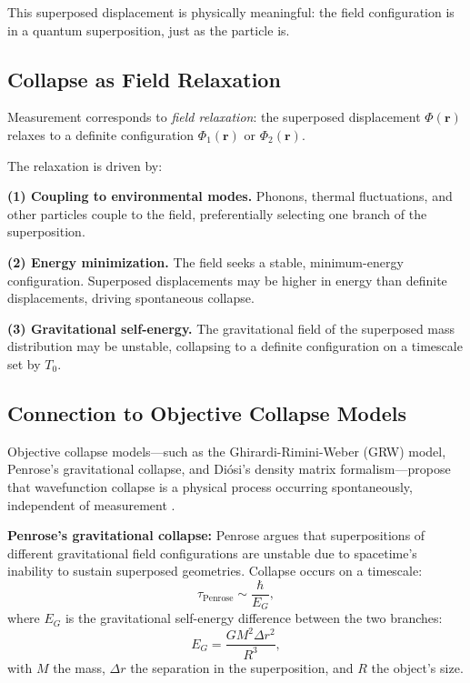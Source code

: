 \documentclass[11pt,a4paper]{article}
\newcommand{\Tzero}{\ensuremath{T_0}}
\theoremstyle{definition}
\theoremstyle{remark}
\begin{document}
This superposed displacement is physically meaningful: the field configuration is in a quantum superposition, just as the particle is.

\subsection{Collapse as Field Relaxation}
\label{sec:collapse_relaxation}

Measurement corresponds to \emph{field relaxation}: the superposed displacement $\Phi(\mathbf{r})$ relaxes to a definite configuration $\Phi_1(\mathbf{r})$ or $\Phi_2(\mathbf{r})$.

The relaxation is driven by:

\textbf{(1) Coupling to environmental modes.} Phonons, thermal fluctuations, and other particles couple to the field, preferentially selecting one branch of the superposition.

\textbf{(2) Energy minimization.} The field seeks a stable, minimum-energy configuration. Superposed displacements may be higher in energy than definite displacements, driving spontaneous collapse.

\textbf{(3) Gravitational self-energy.} The gravitational field of the superposed mass distribution may be unstable, collapsing to a definite configuration on a timescale set by $\Tzero$.

\subsection{Connection to Objective Collapse Models}
\label{sec:objective_collapse}

Objective collapse models---such as the Ghirardi-Rimini-Weber (GRW) model, Penrose's gravitational collapse, and Di\'osi's density matrix formalism---propose that wavefunction collapse is a physical process occurring spontaneously, independent of measurement \cite{Penrose1996,Diosi1989,Ghirardi1986}.

\textbf{Penrose's gravitational collapse:} Penrose argues that superpositions of different gravitational field configurations are unstable due to spacetime's inability to sustain superposed geometries. Collapse occurs on a timescale:
\begin{equation}
\label{eq:penrose_timescale}
\tau_{\mathrm{Penrose}} \sim \frac{\hbar}{E_G},
\end{equation}
where $E_G$ is the gravitational self-energy difference between the two branches:
\begin{equation}
\label{eq:gravitational_self_energy}
E_G = \frac{G M^2 \Delta r^2}{R^3},
\end{equation}
with $M$ the mass, $\Delta r$ the separation in the superposition, and $R$ the object's size.
\end{document}
